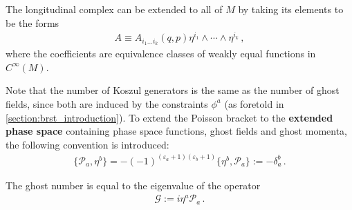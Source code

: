 {        The longitudinal complex can be extended to all of $M$ by taking its elements to be the forms
        \begin{gather}
            A \equiv A_{i_1\ldots i_k}(q,p)\eta^{i_1}\wedge\cdots\wedge\eta^{i_k}\,,
        \end{gather}
        where the coefficients are equivalence classes of weakly equal functions in $C^\infty(M)$.
    }


    Note that the number of Koszul generators is the same as the number of ghost fields, since both are induced by the constraints $\phi^a$ (as foretold in \cref{section:brst_introduction}). To extend the Poisson bracket to the \textbf{extended phase space} containing phase space functions, ghost fields and ghost momenta, the following convention is introduced:
    \begin{gather}
        \{\mathcal{P}_a,\eta^b\} = -(-1)^{(\varepsilon_a+1)(\varepsilon_b+1)}\{\eta^b,\mathcal{P}_a\} := -\delta_a^b\,.
    \end{gather}


    \begin{property}
        The ghost number is equal to the eigenvalue of the operator
        \begin{gather}
            \label{constraint:ghost_number}
            \mathcal{G}:=i\eta^a\mathcal{P}_a\,.
        \end{gather}
    \end{property}

